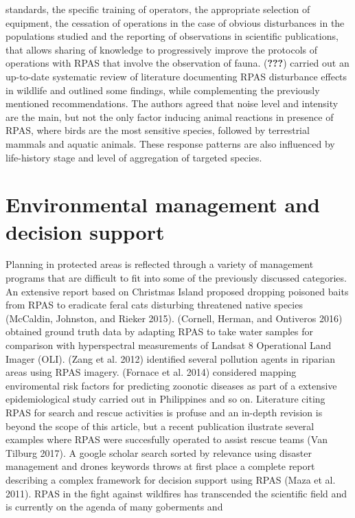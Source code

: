 \documentclass[]{interact}
\theoremstyle{plain}%
\theoremstyle{definition}
\theoremstyle{remark}
\begin{document}
standards, the specific training of operators, the appropriate selection
of equipment, the cessation of operations in the case of obvious
disturbances in the populations studied and the reporting of
observations in scientific publications, that allows sharing of
knowledge to progressively improve the protocols of operations with RPAS
that involve the observation of fauna. ({\textbf{???}}) carried out an
up-to-date systematic review of literature documenting RPAS disturbance
effects in wildlife and outlined some findings, while complementing the
previously mentioned recommendations. The authors agreed that noise
level and intensity are the main, but not the only factor inducing
animal reactions in presence of RPAS, where birds are the most sensitive
species, followed by terrestrial mammals and aquatic animals. These
response patterns are also influenced by life-history stage and level of
aggregation of targeted species.

\section{Environmental management and decision
support}\label{environmental-management-and-decision-support}

Planning in protected areas is reflected through a variety of management
programs that are difficult to fit into some of the previously discussed
categories. An extensive report based on Christmas Island proposed
dropping poisoned baits from RPAS to eradicate feral cats disturbing
threatened native species (McCaldin, Johnston, and Rieker 2015).
(Cornell, Herman, and Ontiveros 2016) obtained ground truth data by
adapting RPAS to take water samples for comparison with hyperspectral
measurements of Landsat 8 Operational Land Imager (OLI). (Zang et al.
2012) identified several pollution agents in riparian areas using RPAS
imagery. (Fornace et al. 2014) considered mapping enviromental risk
factors for predicting zoonotic diseases as part of a extensive
epidemiological study carried out in Philippines and so on. Literature
citing RPAS for search and rescue activities is profuse and an in-depth
revision is beyond the scope of this article, but a recent publication
ilustrate several examples where RPAS were succesfully operated to
assist rescue teams (Van Tilburg 2017). A google scholar search sorted
by relevance using disaster management and drones keywords throws at
first place a complete report describing a complex framework for
decision support using RPAS (Maza et al. 2011). RPAS in the fight
against wildfires has transcended the scientific field and is currently
on the agenda of many goberments and
\end{document}
